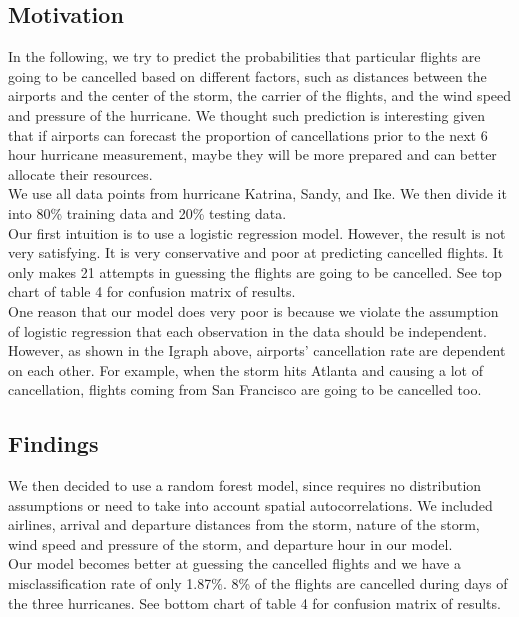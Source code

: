 \subsection{Motivation}
In the following, we try to predict the probabilities that particular flights are going to be cancelled based on different factors, such as distances between the airports and the center of the storm, the carrier of the flights, and the wind speed and pressure of the hurricane. We thought such prediction is interesting given that if airports can forecast the proportion of cancellations prior to the next 6 hour hurricane measurement, maybe they will be more prepared and can better allocate their resources. \\

We use all data points from hurricane Katrina, Sandy, and Ike. We then divide it into 80\% training data and 20\% testing data. \\

Our first intuition is to use a logistic regression model. However, the result is not very satisfying. It is very conservative and poor at predicting cancelled flights. It only makes 21 attempts in guessing the flights are going to be cancelled. See top chart of table 4 for confusion matrix of results. \\

One reason that our model does very poor is because we violate the assumption of logistic regression that each observation in the data should be independent. However, as shown in the Igraph above, airports’ cancellation rate are dependent on each other. For example, when the storm hits Atlanta and causing a lot of cancellation, flights coming from San Francisco are going to be cancelled too. \\

\subsection{Findings}
We then decided to use a random forest model, since requires no distribution assumptions or need to take into account spatial autocorrelations. We included airlines, arrival and departure distances from the storm, nature of the storm, wind speed and pressure of the storm, and departure hour in our model. \\

Our model becomes better at guessing the cancelled flights and we have a misclassification rate of only 1.87\%. 8\% of the flights are cancelled during days of the three hurricanes. See bottom chart of table 4 for confusion matrix of results. \\

